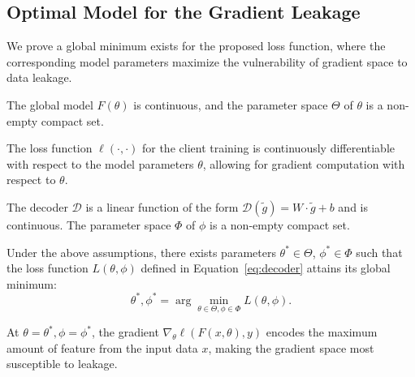 \subsection{Optimal Model for the Gradient Leakage}
We prove a global minimum exists for the proposed loss function, where the corresponding model parameters maximize the vulnerability of gradient space to data leakage.
\begin{assumption}
\label{assumption1}
The global model $F(\theta)$ is continuous, and the parameter space $\Theta$ of $\theta$ is a non-empty compact set.
\end{assumption}
\begin{assumption}
\label{assumption2}
The loss function $\ell(\cdot, \cdot)$ for the client training is continuously differentiable with respect to the model parameters $\theta$, allowing for gradient computation with respect to $\theta$.
\end{assumption}
\begin{assumption}
\label{assumption3}
The decoder $\mathcal{D}$ is a linear function of the form $\mathcal{D}(\tilde{g})=W\cdot\tilde{g}+b$ and is continuous. The parameter space $\Phi$ of $\phi$ is a non-empty compact set.
\end{assumption}
\begin{theorem}
\label{theorem1}
Under the above assumptions, there exists parameters $\theta^*\in\Theta$, $\phi^*\in\Phi$ such that the loss function $L(\theta, \phi)$ defined in Equation~\eqref{eq:decoder} attains its global minimum:
\begin{equation}
    \theta^*, \phi^*=\arg\min_{\theta\in\Theta, \phi\in\Phi}L(\theta, \phi).
\end{equation}
\end{theorem}
At $\theta=\theta^{*}, \phi=\phi^{*}$, the gradient $\nabla_\theta \ell(F(x,\theta),y)$ encodes the maximum amount of feature from the input data $x$, making the gradient space most susceptible to leakage. 
